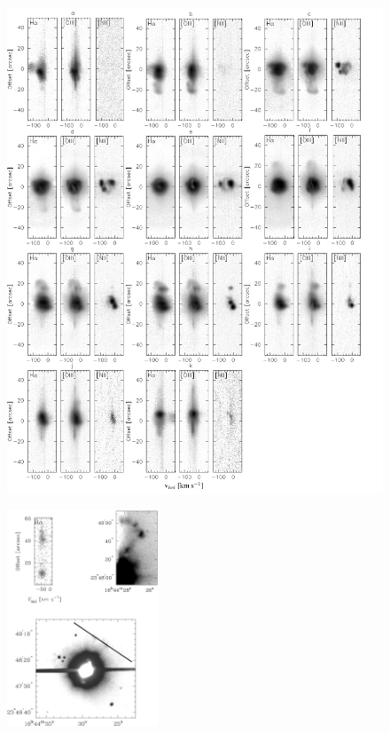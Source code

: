 \documentclass[useAMS, usenatbib]{mnras}
\begin{document}
\begin{figure}
\centering
  \includegraphics[width=1\textwidth]{tere-figs/Figure3}
  \caption{ }
\end{figure}




\begin{figure}
\centering
\includegraphics[width=0.4\textwidth]{tere-figs/Figure6}
  \caption{  }
\end{figure}
\end{document}
